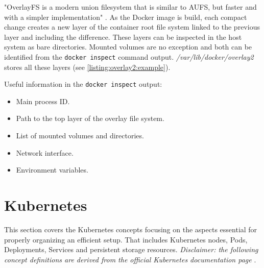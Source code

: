 

"OverlayFS is a modern union filesystem that is similar to AUFS, but faster and with a simpler implementation" \cite{docs:docker:overlayfs}. As the Docker image is build, each compact change creates a new layer of the container root file system linked to the previous layer and including the difference. These layers can be inspected in the host system as bare directories. Mounted volumes are no exception and both can be identified from the \texttt{docker inspect} command output. \textit{/var/lib/docker/overlay2} stores all these layers (see \autoref{listing:overlay2:example}). 



Useful information in the \texttt{docker inspect} output:
\begin{itemize}[noitemsep]
	\item Main process ID.
	\item Path to the top layer of the overlay file system.
	\item List of mounted volumes and directories.
	\item Network interface.
	\item Environment variables.
\end{itemize}

\section{Kubernetes \label{anal:k8s}}
This section covers the Kubernetes concepts focusing on the aspects essential for properly organizing an efficient setup. That includes Kubernetes nodes, Pods, Deployments, Services and persistent storage resources. \textit{Disclaimer: the following concept definitions are derived from the official Kubernetes documentation page} \cite{docs:k8s:concepts}.

